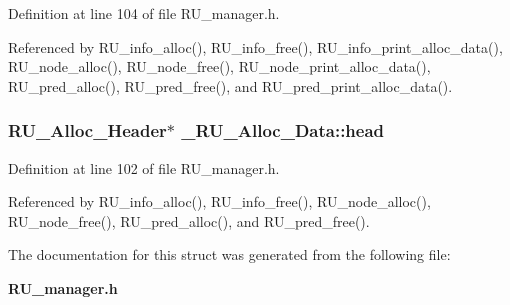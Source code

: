 Definition at line 104 of file RU\_\-manager.h.

Referenced by RU\_\-info\_\-alloc(), RU\_\-info\_\-free(), RU\_\-info\_\-print\_\-alloc\_\-data(), RU\_\-node\_\-alloc(), RU\_\-node\_\-free(), RU\_\-node\_\-print\_\-alloc\_\-data(), RU\_\-pred\_\-alloc(), RU\_\-pred\_\-free(), and RU\_\-pred\_\-print\_\-alloc\_\-data().
\subsubsection{\setlength{\rightskip}{0pt plus 5cm}\bf{RU\_\-Alloc\_\-Header}$\ast$ \bf{\_\-RU\_\-Alloc\_\-Data::head}}\label{struct__RU__Alloc__Data_81f7abdcd147f40787bd09e28f77ce4a}




Definition at line 102 of file RU\_\-manager.h.

Referenced by RU\_\-info\_\-alloc(), RU\_\-info\_\-free(), RU\_\-node\_\-alloc(), RU\_\-node\_\-free(), RU\_\-pred\_\-alloc(), and RU\_\-pred\_\-free().

The documentation for this struct was generated from the following file:\begin{CompactItemize}
\item 
\bf{RU\_\-manager.h}\end{CompactItemize}
